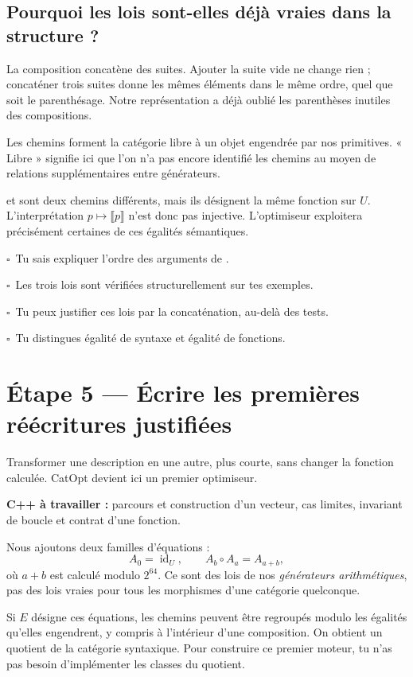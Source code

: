\documentclass[11pt,a4paper]{article}
\newcommand{\code}[1]{\texttt{\detokenize{#1}}}
\newcommand{\Id}{\operatorname{id}}
\newcommand{\sem}[1]{\llbracket #1\rrbracket}
\newcommand{\checkpoint}{\(\square\)\ }
\newcommand{\etape}[2]{\clearpage\section{Étape #1 — #2}}
\begin{document}
\subsection{Pourquoi les lois sont-elles déjà vraies dans la structure ?}
La composition concatène des suites. Ajouter la suite vide ne change rien ;
concaténer trois suites donne les mêmes éléments dans le même ordre, quel
que soit le parenthésage. Notre représentation a déjà oublié les parenthèses
inutiles des compositions.

Les chemins forment la catégorie libre à un objet engendrée par nos
primitives. « Libre » signifie ici que l'on n'a pas encore identifié les
chemins au moyen de relations supplémentaires entre générateurs.

\begin{vigilance}
\code{[Add(1), Add(2)]} et \code{[Add(3)]} sont deux chemins différents,
mais ils désignent la même fonction sur \(U\). L'interprétation
\(p\mapsto\sem{p}\) n'est donc pas injective. L'optimiseur exploitera
précisément certaines de ces égalités sémantiques.
\end{vigilance}

\begin{validation}
\checkpoint Tu sais expliquer l'ordre des arguments de \code{compose}.\par
\checkpoint Les trois lois sont vérifiées structurellement sur tes exemples.\par
\checkpoint Tu peux justifier ces lois par la concaténation, au-delà des tests.\par
\checkpoint Tu distingues égalité de syntaxe et égalité de fonctions.
\end{validation}

\etape{5}{Écrire les premières réécritures justifiées}
\label{sec:reecriture}
\begin{objectif}
Transformer une description en une autre, plus courte, sans changer la
fonction calculée. CatOpt devient ici un premier optimiseur.
\end{objectif}

\textbf{C++ à travailler :} parcours et construction d'un vecteur, cas limites,
invariant de boucle et contrat d'une fonction.

\begin{theorie}
Nous ajoutons deux familles d'équations :
\[
A_0=\Id_U,\qquad A_b\circ A_a=A_{a+b},
\]
où \(a+b\) est calculé modulo \(2^{64}\). Ce sont des lois de nos
\emph{générateurs arithmétiques}, pas des lois vraies pour tous les morphismes
d'une catégorie quelconque.

Si \(E\) désigne ces équations, les chemins peuvent être regroupés modulo
les égalités qu'elles engendrent, y compris à l'intérieur d'une composition.
On obtient un quotient de la catégorie syntaxique. Pour construire ce
premier moteur, tu n'as pas besoin d'implémenter les classes du quotient.
\end{theorie}
\end{document}
